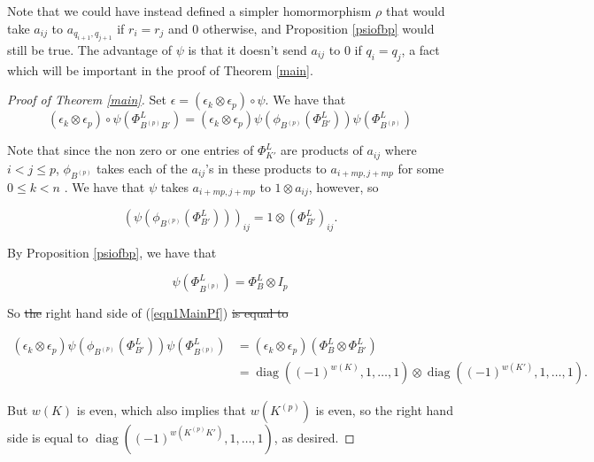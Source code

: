 \documentclass[11pt]{amsart}
\begin{document}
Note that we could have instead defined a simpler homormorphism $\rho$ that would take $a_{ij}$ to $a_{q_{i+1},q_{j+1}}$ if $r_i=r_j$ and 0 otherwise, and Proposition \ref{psiofbp} would still be true.  The advantage of $\psi$ is that it doesn't send $a_{ij}$ to 0 if $q_i=q_j$, a fact which will be important in the proof of Theorem \ref{main}.


\begin{proof}[Proof of Theorem \ref{main}]
Set $\epsilon = (\epsilon_k\otimes\epsilon_p)\circ\psi$.  We  have that
\begin{equation}
(\epsilon_k\otimes\epsilon_p)\circ\psi\left(\Phi_{B^{(p)}B'}^L\right) = (\epsilon_k\otimes\epsilon_p)\psi\left(\phi_{B^{(p)}}\left(\Phi_{B'}^L\right)\right)\psi\left(\Phi_{B^{(p)}}^L\right)
\label{eqn1MainPf}
\end{equation}

Note that since the non zero or one entries of $\Phi_{K'}^L$  are products of $a_{ij}$ where $i<j \le p$, $\phi_{B^{(p)}}$ takes each of the $a_{ij}$'s in these products to $a_{i + mp, j+mp}$ for some $0\le k<n$ .  We have that $\psi$ takes $a_{i + mp, j+mp}$ to $1\otimes a_{ij}$, however, so

$$\left(\psi\left(\phi_{B^{(p)}}\left(\Phi_{B'}^L\right)\right)\right)_{ij} = 1\otimes(\Phi_{B'}^L)_{ij}.$$

\noindent By Proposition \ref{psiofbp}, we have that 

$$\psi\left(\Phi_{B^{(p)}}^L\right) = \Phi_B^L\otimes I_p$$

\noindent So \sout{the}  right hand side of (\ref{eqn1MainPf})  \sout{is equal to}

\begin{align*}
(\epsilon_k\otimes\epsilon_p)\psi\left(\phi_{B^{(p)}}\left(\Phi_{B'}^L\right)\right)\psi\left(\Phi_{B^{(p)}}^L\right)
    & = (\epsilon_k\otimes\epsilon_p)\left(\Phi_B^L\otimes\Phi_{B'}^L\right)\\
    & = \operatorname{diag}((-1)^{w(K)},1,\ldots,1)\otimes\operatorname{diag}((-1)^{w(K')},1,\ldots,1).
\end{align*}

\noindent But $w(K)$ is even, which also implies that $w(K^{(p)})$ is even, so the right hand side is equal to $\operatorname{diag}((-1)^{w(K^{(p)}K')},1,\ldots,1)$, as desired.

\end{proof}
\end{document}
